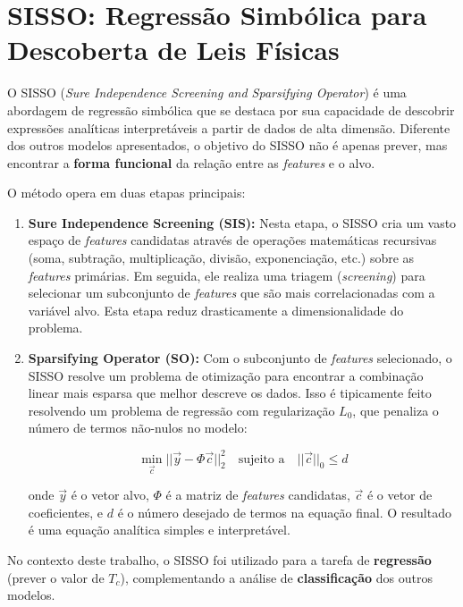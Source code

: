 \documentclass[12pt, a4paper, oneside]{report}
\begin{document}
\section{SISSO: Regressão Simbólica para Descoberta de Leis Físicas}
\label{sec:sisso}

O SISSO (\textit{Sure Independence Screening and Sparsifying Operator}) \cite{ouyang2018} é uma abordagem de regressão simbólica que se destaca por sua capacidade de descobrir expressões analíticas interpretáveis a partir de dados de alta dimensão. Diferente dos outros modelos apresentados, o objetivo do SISSO não é apenas prever, mas encontrar a \textbf{forma funcional} da relação entre as \textit{features} e o alvo.

O método opera em duas etapas principais:

\begin{enumerate}
    \item \textbf{Sure Independence Screening (SIS):} Nesta etapa, o SISSO cria um vasto espaço de \textit{features} candidatas através de operações matemáticas recursivas (soma, subtração, multiplicação, divisão, exponenciação, etc.) sobre as \textit{features} primárias. Em seguida, ele realiza uma triagem (\textit{screening}) para selecionar um subconjunto de \textit{features} que são mais correlacionadas com a variável alvo. Esta etapa reduz drasticamente a dimensionalidade do problema.
    
    \item \textbf{Sparsifying Operator (SO):} Com o subconjunto de \textit{features} selecionado, o SISSO resolve um problema de otimização para encontrar a combinação linear mais esparsa que melhor descreve os dados. Isso é tipicamente feito resolvendo um problema de regressão com regularização $L_0$, que penaliza o número de termos não-nulos no modelo:
    
    \begin{equation}
        \min_{\vec{c}} ||\vec{y} - \Phi \vec{c}||_2^2 \quad \text{sujeito a} \quad ||\vec{c}||_0 \le d
    \end{equation}
    
    onde $\vec{y}$ é o vetor alvo, $\Phi$ é a matriz de \textit{features} candidatas, $\vec{c}$ é o vetor de coeficientes, e $d$ é o número desejado de termos na equação final. O resultado é uma equação analítica simples e interpretável.
\end{enumerate}

No contexto deste trabalho, o SISSO foi utilizado para a tarefa de \textbf{regressão} (prever o valor de $T_c$), complementando a análise de \textbf{classificação} dos outros modelos.
\end{document}
